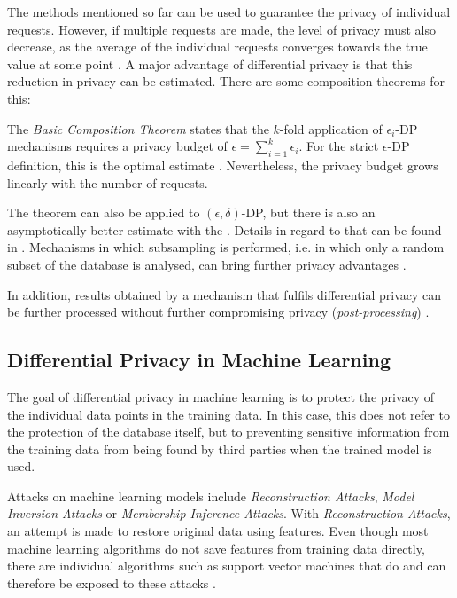 The methods mentioned so far can be used to guarantee the privacy of individual requests. However, if multiple requests are made, the level of privacy must also decrease, as the average of the individual requests converges towards the true value at some point \cite[p.42]{dwork:2014}. A major advantage of differential privacy is that this reduction in privacy can be estimated. There are some composition theorems for this:

The \textit{Basic Composition Theorem} states that the $k$-fold application of $\epsilon_i$-DP mechanisms requires a privacy budget of $\epsilon = \sum_{i=1}^{k}\epsilon_i$. For the strict $\epsilon$-DP definition, this is the optimal estimate \cite{steinke:2022}. Nevertheless, the privacy budget grows linearly with the number of requests. 

The theorem can also be applied to $(\epsilon, \delta)$-DP, but there is also an asymptotically better estimate with the \textcite{Advanced Composition Theorem}. Details in regard to that can be found in \textcite{dwork:2010, steinke:2022}.
Mechanisms in which subsampling is performed, i.e. in which only a random subset of the database is analysed, can bring further privacy advantages \cite{mironov:2019, steinke:2022}.

In addition, results obtained by a mechanism that fulfils differential privacy can be further processed without further compromising privacy (\textit{post-processing}) \cite{dwork:2014}.

\subsection{Differential Privacy in Machine Learning}\label{sec:fund-dp-in-ml}

The goal of differential privacy in machine learning is to protect the privacy of the individual data points in the training data.
In this case, this does not refer to the protection of the database itself, but to preventing sensitive information from the training data from being found by third parties when the trained model is used. 

Attacks on machine learning models include \textit{Reconstruction Attacks}, \textit{Model Inversion Attacks} or \textit{Membership Inference Attacks}. With \textit{Reconstruction Attacks}, an attempt is made to restore original data using features. 
Even though most machine learning algorithms do not save features from training data directly, there are individual algorithms such as support vector machines that do and can therefore be exposed to these attacks \cite[p.9ff]{chang:2023}.


